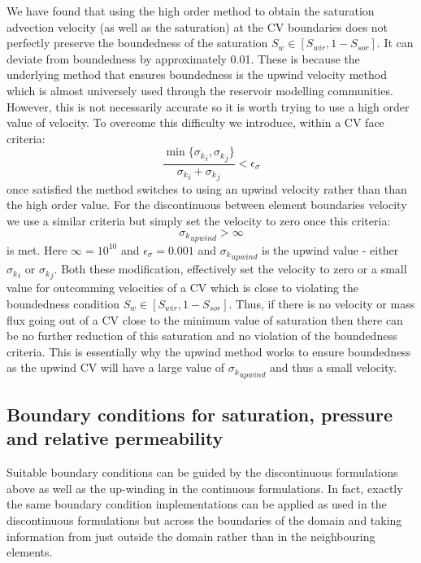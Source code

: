 We have found that using the high order method to obtain the saturation advection
velocity (as well as the saturation) at the CV boundaries does not perfectly preserve
the boundedness of the saturation $S_w\in \left[ S_{wir}, 1-S_{sor} \right]$.
It can deviate from boundedness by approximately 0.01.
These is because the underlying method that ensures boundedness is the upwind
velocity method which is almost universely used through the reservoir
modelling communities. However, this is not necessarily accurate so it
is worth trying to use a high order value of velocity.
To overcome this difficulty we introduce,  within a CV face criteria:
\begin{equation}
\frac{ \min\{ {\sigma_k}_i, {\sigma_k}_j \}  }{{\sigma_k}_i +{\sigma_k}_j} < \epsilon_\sigma
\end{equation}
once satisfied the method switches to using an upwind velocity rather than
than the high order value.
For the discontinuous between element boundaries velocity we use a similar criteria
but simply set the velocity to zero once this criteria:
\begin{equation}
{\sigma_k}_{upwind} > \infty
\end{equation}
is met. Here $\infty=10^{10}$ and $\epsilon_\sigma=0.001$ and
${\sigma_k}_{upwind}$ is the upwind value - either ${\sigma_k}_i$ or ${\sigma_k}_j$.
Both these modification, effectively set the velocity to zero or a small value
for outcomming velocities of a CV which is close to violating the boundedness
condition  $S_w\in \left[ S_{wir}, 1-S_{sor} \right]$.
Thus, if there is no velocity or mass flux going out of a CV close to
the minimum value of saturation then there can be no further reduction of this saturation and no
violation of the boundedness criteria.
This is essentially why the upwind method works to ensure boundedness as the
upwind CV will have a large value of ${\sigma_k}_{upwind}$ and thus a small
velocity.




\subsection{Boundary conditions for saturation, pressure and relative permeability}
\label{bcs-rel-perm}
Suitable boundary conditions can be guided by the
discontinuous formulations above as well as the up-winding in
the continuous formulations. In fact, exactly the same
boundary condition implementations can be applied as used in
the discontinuous formulations but across the boundaries
of the domain and taking information from just outside the domain
rather than in the neighbouring elements.

